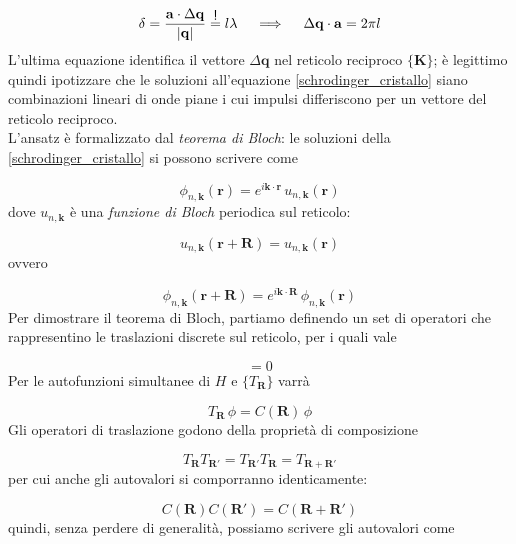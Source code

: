 \documentclass[a4paper]{report}
\newcommand\impongo{\mathrel{\overset{\makebox[0pt]{\mbox{\normalfont\sffamily !}}}{=}}}
\begin{document}
\begin{equation}
    \delta = \frac{\mathbf{a}\cdot \Delta\mathbf{q}}{|\mathbf{q}|} \impongo l\lambda \quad\implies\quad \Delta \mathbf{q} \cdot \mathbf{a} = 2 \pi l
\end{equation}
L'ultima equazione identifica il vettore $\Delta \mathbf{q}$ nel reticolo reciproco $\{\mathbf{K}\}$; è legittimo quindi ipotizzare che le soluzioni all'equazione \eqref{schrodinger_cristallo} siano combinazioni lineari di onde piane i cui impulsi differiscono per un vettore del reticolo reciproco. \\
L'ansatz è formalizzato dal \textit{teorema di Bloch}: le soluzioni della \eqref{schrodinger_cristallo} si possono scrivere come

\begin{equation}
    \phi_{n,\mathbf{k}}(\mathbf{r}) = e^{i\mathbf{k}\cdot\mathbf{r}}\,u_{n,\mathbf{k}}(\mathbf{r})
\end{equation}
dove $u_{n,\mathbf{k}}$ è una \textit{funzione di Bloch} periodica sul reticolo:

\begin{equation}
    u_{n,\mathbf{k}}(\mathbf{r}+\mathbf{R}) = u_{n,\mathbf{k}}(\mathbf{r})
\end{equation}
ovvero

\begin{equation}
    \phi_{n,\mathbf{k}}(\mathbf{r}+\mathbf{R}) = e^{i\mathbf{k}\cdot \mathbf{R}}\, \phi_{n,\mathbf{k}}(\mathbf{r})
\end{equation}
Per dimostrare il teorema di Bloch, partiamo definendo un set di operatori che rappresentino le traslazioni discrete sul reticolo, per i quali vale

\begin{equation}
    [T_{\mathbf{R}}, H] = 0
\end{equation}
Per le autofunzioni simultanee di $H$ e $\{T_{\mathbf{R}}\}$ varrà

\begin{equation}
    T_{\mathbf{R}}\,\phi = C(\mathbf{R})\,\phi
\end{equation}
Gli operatori di traslazione godono della proprietà di composizione

\begin{equation}
    T_{\mathbf{R}} T_{\mathbf{R}'} =  T_{\mathbf{R}'} T_{\mathbf{R}} =  T_{\mathbf{R}+\mathbf{R}'}
\end{equation}
per cui anche gli autovalori si comporranno identicamente:

\begin{equation}
    C(\mathbf{R})C(\mathbf{R}') = C(\mathbf{R}+\mathbf{R}')
\end{equation}
quindi, senza perdere di generalità, possiamo scrivere gli autovalori come
\end{document}
